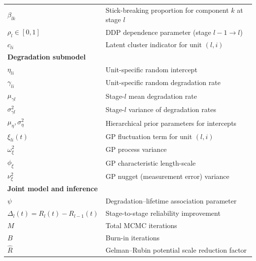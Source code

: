 \documentclass[a4paper,fleqn,longmktitle]{cas-sc}
\begin{document}
\begin{table}
\begin{tabular}{ll}
$\beta_{lk}$ & Stick-breaking proportion for component $k$ at stage $l$ \\
$\rho_l \in [0,1]$ & DDP dependence parameter (stage $l-1\to l$) \\
$c_{li}$ & Latent cluster indicator for unit $(l,i)$ \\
\midrule
\multicolumn{2}{l}{\textbf{Degradation submodel}} \\
$\eta_{li}$ & Unit-specific random intercept \\
$\gamma_{li}$ & Unit-specific random degradation rate \\
$\mu_{\gamma l}$ & Stage-$l$ mean degradation rate \\
$\sigma_{\gamma l}^2$ & Stage-$l$ variance of degradation rates \\
$\mu_\eta, \sigma_\eta^2$ & Hierarchical prior parameters for intercepts \\
$\xi_{li}(t)$ & GP fluctuation term for unit $(l,i)$ \\
$\omega_\xi^2$ & GP process variance \\
$\phi_\xi$ & GP characteristic length-scale \\
$\nu_\xi^2$ & GP nugget (measurement error) variance \\
\midrule
\multicolumn{2}{l}{\textbf{Joint model and inference}} \\
$\psi$ & Degradation--lifetime association parameter \\
$\Delta_l(t) = R_l(t) - R_{l-1}(t)$ & Stage-to-stage reliability improvement \\
$M$ & Total MCMC iterations \\
$B$ & Burn-in iterations \\
$\widehat{R}$ & Gelman--Rubin potential scale reduction factor \\
\bottomrule
\end{tabular}
\end{table}
\end{document}
